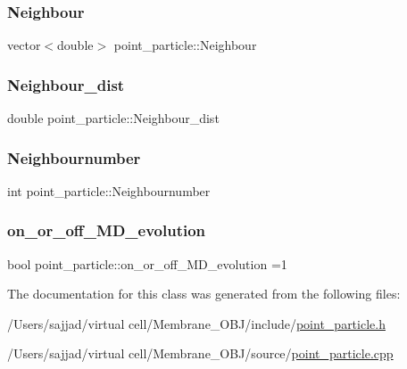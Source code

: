 \subsubsection{\texorpdfstring{Neighbour}{Neighbour}}
{\footnotesize\ttfamily vector$<$double$>$ point\+\_\+particle\+::\+Neighbour}

\mbox{\label{classpoint__particle_a0d5ac2e186afd64b4d50ec2835fe9706}} 
\subsubsection{\texorpdfstring{Neighbour\_dist}{Neighbour\_dist}}
{\footnotesize\ttfamily double point\+\_\+particle\+::\+Neighbour\+\_\+dist}

\mbox{\label{classpoint__particle_a434dc5e0503b9c29546dd906b57288fd}} 
\subsubsection{\texorpdfstring{Neighbournumber}{Neighbournumber}}
{\footnotesize\ttfamily int point\+\_\+particle\+::\+Neighbournumber}

\mbox{\label{classpoint__particle_afee389a618e3c3c64e255329b1985ae3}} 
\subsubsection{\texorpdfstring{on\_or\_off\_MD\_evolution}{on\_or\_off\_MD\_evolution}}
{\footnotesize\ttfamily bool point\+\_\+particle\+::on\+\_\+or\+\_\+off\+\_\+\+M\+D\+\_\+evolution =1}



The documentation for this class was generated from the following files\+:\begin{DoxyCompactItemize}
\item 
/\+Users/sajjad/virtual cell/\+Membrane\+\_\+\+O\+B\+J/include/\mbox{\hyperlink{point__particle_8h}{point\+\_\+particle.\+h}}\item 
/\+Users/sajjad/virtual cell/\+Membrane\+\_\+\+O\+B\+J/source/\mbox{\hyperlink{point__particle_8cpp}{point\+\_\+particle.\+cpp}}\end{DoxyCompactItemize}
